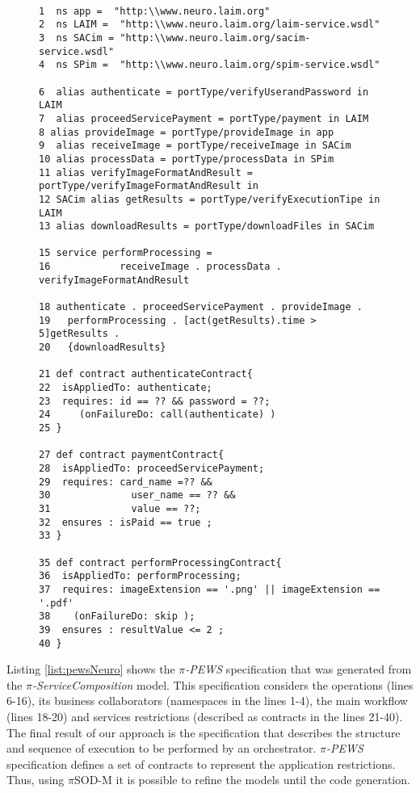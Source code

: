 \begin{figure}
\tiny
\centering

\begin{lstlisting}[label=list:pewsNeuro,caption=pi-PEWS Specification: Perform
Image Processing. ]

1  ns app =  "http:\\www.neuro.laim.org"
2  ns LAIM =  "http:\\www.neuro.laim.org/laim-service.wsdl"
3  ns SACim = "http:\\www.neuro.laim.org/sacim-service.wsdl"
4  ns SPim =  "http:\\www.neuro.laim.org/spim-service.wsdl"

6  alias authenticate = portType/verifyUserandPassword in LAIM
7  alias proceedServicePayment = portType/payment in LAIM
8 alias provideImage = portType/provideImage in app
9  alias receiveImage = portType/receiveImage in SACim
10 alias processData = portType/processData in SPim
11 alias verifyImageFormatAndResult = portType/verifyImageFormatAndResult in
12 SACim alias getResults = portType/verifyExecutionTipe in LAIM
13 alias downloadResults = portType/downloadFiles in SACim

15 service performProcessing = 
16            receiveImage . processData . verifyImageFormatAndResult

18 authenticate . proceedServicePayment . provideImage . 
19   performProcessing . [act(getResults).time > 5]getResults .
20   {downloadResults}

21 def contract authenticateContract{
22  isAppliedTo: authenticate;    
23  requires: id == ?? && password = ??;
24     (onFailureDo: call(authenticate) )  
25 }

27 def contract paymentContract{
28  isAppliedTo: proceedServicePayment;    
29  requires: card_name =?? && 
30  			user_name == ?? && 
31  			value == ??;  
32  ensures : isPaid == true ;
33 }

35 def contract performProcessingContract{
36  isAppliedTo: performProcessing;    
37  requires: imageExtension == '.png' || imageExtension == '.pdf'
38    (onFailureDo: skip );    
39  ensures : resultValue <= 2 ;
40 }
\end{lstlisting}
\label{fig:pewsNeuro}  
\end{figure}  



Listing \ref{list:pewsNeuro} shows the \textit{$\pi$-PEWS} specification that
was generated from the \textit{$\pi$-ServiceComposition} model. This
specification considers the operations (lines 6-16), its business collaborators
(namespaces in the lines 1-4), the main workflow (lines 18-20) and services
restrictions (described as contracts in the lines 21-40). The final result of
our approach is the specification that describes the structure and sequence of
execution to be performed by an orchestrator. \textit{$\pi$-PEWS}
specification defines a set of contracts to represent the application restrictions. Thus,
using $\pi$SOD-M it is possible to refine the models until the code generation.
 
